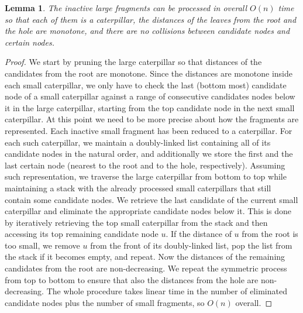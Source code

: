 \documentclass[11pt,a4paper]{article}
\newtheorem{lemma}{Lemma}
\theoremstyle{definition}
\theoremstyle{remark}
\begin{document}
\begin{lemma}\label{lemma3}
	The inactive large fragments can be processed in overall $O(n)$ time so that each of them is a caterpillar, the distances of the leaves from the root and the hole are monotone, and there are no collisions between candidate nodes and certain nodes.
\end{lemma}
\begin{proof}

We start by pruning the large caterpillar so that distances of the candidates from the root are
monotone. Since the distances are monotone inside each small caterpillar, we only have to check the last (bottom most) 
candidate node of a small caterpillar against a range of consecutive candidates nodes below it in the large
caterpillar, starting from the top candidate node in the next small caterpillar. 
At this point we need to be more precise about how the fragments are represented. Each inactive small
fragment has been reduced to a caterpillar. For each such caterpillar, we maintain a doubly-linked list containing
all of its candidate nodes in the natural order, and additionally we store the first and the last certain
node (nearest to the root and to the hole, respectively). Assuming such representation, we traverse
the large caterpillar from bottom to top while
maintaining a stack with the already processed small caterpillars that still contain some candidate nodes.
We retrieve the last candidate of the current small caterpillar and eliminate the appropriate candidate
nodes below it. This is done by iteratively retrieving the top small caterpillar from the stack and then
accessing its top remaining candidate node $u$. If the distance of $u$ from the root is too small, we
remove $u$ from the front of its doubly-linked list, pop the list from the stack if it becomes empty,
and repeat. Now the distances of the remaining candidates from the root are
non-decreasing. We repeat the symmetric process from top to bottom to ensure that also the distances
from the hole are non-decreasing. The whole procedure takes linear time in the number of eliminated
candidate nodes plus the number of small fragments, so $O(n)$ overall.


\end{proof}
\end{document}
